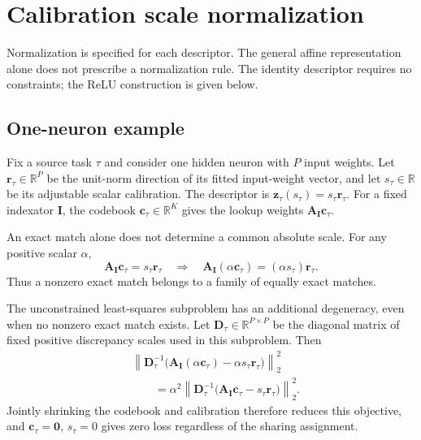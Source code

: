 \section{Calibration scale normalization}
\label{app:calibration-normalization}

Normalization is specified for each descriptor. The general affine
representation alone does not prescribe a normalization rule.
The identity descriptor requires no constraints; the ReLU construction
is given below.

\subsection{One-neuron example}
\label{app:calibration-example}

Fix a source task $\tau$ and consider one hidden neuron with $P$ input
weights. Let $\mathbf r_\tau\in\mathbb R^P$ be the unit-norm direction
of its fitted input-weight vector, and let $s_\tau\in\mathbb R$ be
its adjustable scalar calibration. The descriptor is
$\mathbf z_\tau(s_\tau)=s_\tau\mathbf r_\tau$.
For a fixed indexator $\mathbf I$, the codebook
$\mathbf c_\tau\in\mathbb R^K$ gives the lookup weights
$\mathbf A_{\mathbf I}\mathbf c_\tau$.

An exact match alone does not determine a common absolute scale.
For any positive scalar $\alpha$,
\begin{equation}
    \mathbf A_{\mathbf I}\mathbf c_\tau=s_\tau\mathbf r_\tau
    \quad\Longrightarrow\quad
    \mathbf A_{\mathbf I}(\alpha\mathbf c_\tau)
        =(\alpha s_\tau)\mathbf r_\tau.
    \label{eq:appendix-calibration-scale}
\end{equation}
Thus a nonzero exact match belongs to a family of equally exact matches.

The unconstrained least-squares subproblem has an additional degeneracy,
even when no nonzero exact match exists. Let
$\mathbf D_\tau\in\mathbb R^{P\times P}$ be the diagonal matrix of
fixed positive discrepancy scales used in this subproblem. Then
\begin{equation}
    \begin{aligned}
        &\left\|\mathbf D_\tau^{-1}
            \bigl(\mathbf A_{\mathbf I}(\alpha\mathbf c_\tau)
                -\alpha s_\tau\mathbf r_\tau\bigr)\right\|_2^2\\
        &\qquad=\alpha^2
        \left\|\mathbf D_\tau^{-1}
            \bigl(\mathbf A_{\mathbf I}\mathbf c_\tau
                -s_\tau\mathbf r_\tau\bigr)\right\|_2^2.
    \end{aligned}
    \label{eq:appendix-calibration-collapse}
\end{equation}
Jointly shrinking the codebook and calibration therefore reduces this
objective, and $\mathbf c_\tau=\mathbf0$, $s_\tau=0$ gives zero loss
regardless of the sharing assignment.

